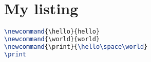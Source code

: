 \documentclass[
    load-dhbw-templates,
    print,                  %
    add-tocs-to-toc,
    debug,
    language = ngerman
]{iodhbwm}
\begin{document}
    
    \chapter{My listing}
        \blindtext
        
        \begin{lstlisting}[caption={Hello World},language=TeX]
\newcommand{\hello}{hello}
\newcommand{\world}{world}
\newcommand{\print}{\hello\space\world}
\print
        \end{lstlisting}
        
        \blindtext
    
    \Blinddocument
\end{document}
